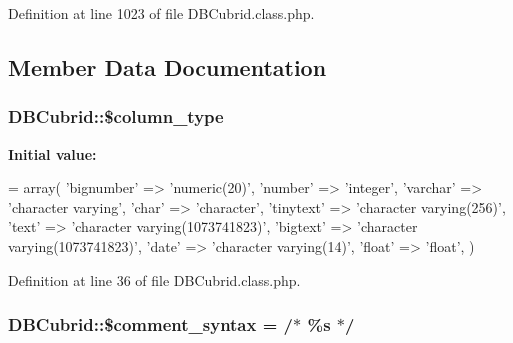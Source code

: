 Definition at line 1023 of file D\+B\+Cubrid.\+class.\+php.



\subsection{Member Data Documentation}
\hypertarget{classDBCubrid_a92995e5eed892ec4076cb3c1f5fdb2f1}{}
\subsubsection[{\$column\+\_\+type}]{\setlength{\rightskip}{0pt plus 5cm}D\+B\+Cubrid\+::\$column\+\_\+type}\label{classDBCubrid_a92995e5eed892ec4076cb3c1f5fdb2f1}
{\bfseries Initial value\+:}
\begin{DoxyCode}
= array(
        \textcolor{stringliteral}{'bignumber'} => \textcolor{stringliteral}{'numeric(20)'},
        \textcolor{stringliteral}{'number'} => \textcolor{stringliteral}{'integer'},
        \textcolor{stringliteral}{'varchar'} => \textcolor{stringliteral}{'character varying'},
        \textcolor{stringliteral}{'char'} => \textcolor{stringliteral}{'character'},
        \textcolor{stringliteral}{'tinytext'} => \textcolor{stringliteral}{'character varying(256)'},
        \textcolor{stringliteral}{'text'} => \textcolor{stringliteral}{'character varying(1073741823)'},
        \textcolor{stringliteral}{'bigtext'} => \textcolor{stringliteral}{'character varying(1073741823)'},
        \textcolor{stringliteral}{'date'} => \textcolor{stringliteral}{'character varying(14)'},
        \textcolor{stringliteral}{'float'} => \textcolor{stringliteral}{'float'},
    )
\end{DoxyCode}


Definition at line 36 of file D\+B\+Cubrid.\+class.\+php.

\hypertarget{classDBCubrid_a0060c7dcaf443efddbe4492d4479fe0b}{}
\subsubsection[{\$comment\+\_\+syntax}]{\setlength{\rightskip}{0pt plus 5cm}D\+B\+Cubrid\+::\$comment\+\_\+syntax = \textquotesingle{}/$\ast$ \%s $\ast$/\textquotesingle{}}\label{classDBCubrid_a0060c7dcaf443efddbe4492d4479fe0b}


